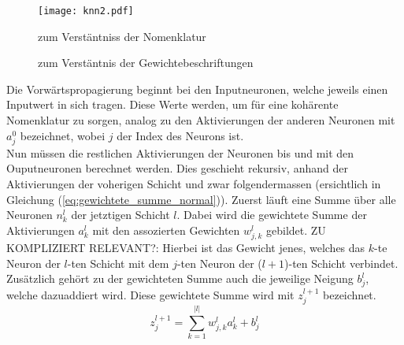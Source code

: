 \begin{figure}[h!]
  \centering
  \texttt{[image: knn2.pdf]}
  \caption{zum Verstäntniss der Nomenklatur}
  \label{fig:nomenklatur1}
\end{figure}
\para{}
\begin{figure}[h!]
  \centering
  \caption{zum Verstäntnis der Gewichtebeschriftungen}
  \label{fig:nomenklatur2}
\end{figure}
\para{}
Die Vorwärtspropagierung beginnt bei den Inputneuronen, welche jeweils
einen Inputwert in sich tragen. Diese Werte werden, um für eine kohärente Nomenklatur zu sorgen,
analog zu den Aktivierungen der anderen Neuronen mit $a_j^0$ bezeichnet, wobei
$j$ der Index des Neurons ist. \\
Nun müssen die restlichen Aktivierungen der Neuronen bis und mit den Ouputneuronen berechnet werden. Dies geschieht rekursiv, anhand der
Aktivierungen der voherigen Schicht und zwar folgendermassen (ersichtlich in
Gleichung (\ref{eq:gewichtete_summe_normal})).
\para{}
Zuerst läuft eine Summe über alle Neuronen $n_k^{l}$ der jetztigen Schicht
$l$. Dabei wird die gewichtete Summe der Aktivierungen $a_k^{l}$ mit den
assozierten Gewichten $w_{j,k}^l$ gebildet. ZU KOMPLIZIERT RELEVANT?: Hierbei ist das Gewicht jenes, welches das
$k$-te Neuron der $l$-ten Schicht mit dem $j$-ten Neuron der ($l+1$)-ten Schicht verbindet.
Zusätzlich gehört zu der gewichteten Summe auch die jeweilige Neigung $b_j^l$, welche
dazuaddiert wird. Diese gewichtete Summe wird mit $z_j^{l+1}$ bezeichnet.
\\
\begin{equation}\tag{FP1}\label{eq:gewichtete_summe_normal}
  z_j^{l+1} = \sum_{k=1}^{|l|} w_{j,k}^l a_k^l + b_j^l
\end{equation}
\\
